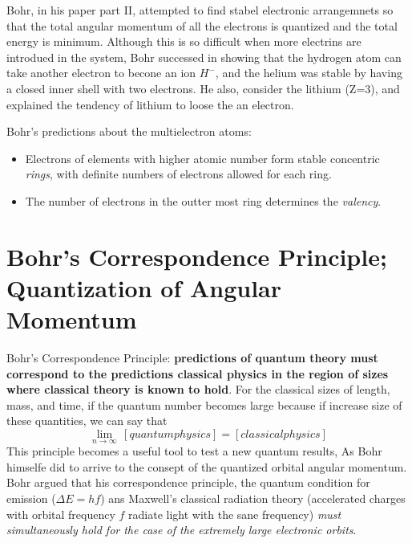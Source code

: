         \bulletpar Bohr, in his paper part II, attempted to find stabel electronic arrangemnets so that the total angular momentum of all the electrons is quantized and 
        the total energy is minimum. Although this is so difficult when more electrins are introdued in the system, Bohr successed in showing that the hydrogen atom can 
        take another electron to becone an ion $H^-$, and the helium was stable by having a closed inner shell with two electrons. He also, consider the lithium (Z=3), and 
        explained the tendency of lithium to loose the an electron.

        \starpar Bohr's predictions about the multielectron atoms:
        \begin{itemize}
            \item Electrons of elements with higher atomic number form stable concentric \textit{rings}, with definite numbers of electrons allowed for each ring.
            \item The number of electrons in the outter most ring determines the \textit{valency}.
        \end{itemize}


    \section{Bohr's Correspondence Principle; Quantization of Angular Momentum}
        Bohr's Correspondence Principle: \textbf{predictions of quantum theory must correspond to the predictions classical physics in the region of sizes where 
        classical theory is known to hold}.
        For the classical sizes of length, mass, and time, if the quantum number becomes large because if increase size of these quantities, we can say that
        $$ \lim_{n \to \infty}\, [quantum physics] = [classical physics]$$
        This principle becomes a useful tool to test a new quantum results, As Bohr himselfe did to arrive to the consept of the quantized orbital angular momentum.
        Bohr argued that his correspondence principle, the quantum condition for emission ($\Delta{E}=hf$) ans Maxwell's classical radiation theory (accelerated charges 
        with orbital frequency $f$ radiate light with the sane frequency) \textit{must simultaneously hold for the case of the extremely large electronic orbits}.


